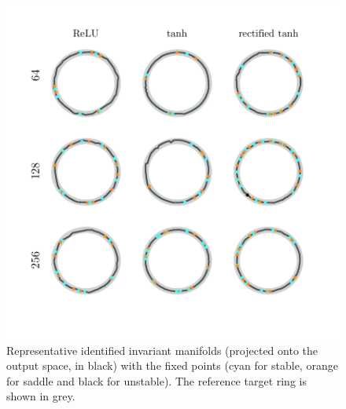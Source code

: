 \documentclass{article} %
\newcounter{ct}
\theoremstyle{definition}
\theoremstyle{remark}
\begin{document}
 \begin{figure}[tbhp]
     \centering
    \includegraphics[width=\textwidth]{im_all_last2}
       \caption{Representative identified invariant manifolds (projected onto the output space, in black) with the fixed points (cyan for stable, orange for saddle and black for unstable).
        The reference target ring is shown in grey.}
       \label{fig:im_rep}
\end{figure}
\end{document}
